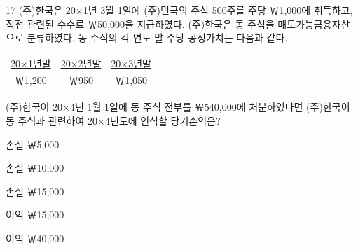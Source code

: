 \begin{question}{17}
(주)한국은 20×1년 3월 1일에 (주)민국의 주식 500주를 주당 ￦1,000에 취득하고, 직접 관련된 수수료 ￦50,000을 지급하였다. (주)한국은 동 주식을 매도가능금융자산으로 분류하였다. 동 주식의 각 연도 말 주당 공정가치는 다음과 같다.
{\centering\begin{tabular}{ccc}
\uline{20×1년말} & \uline{20×2년말} & \uline{20×3년말} \\
￦1,200 & ￦950 & ￦1,050 \\
\end{tabular}\par}
(주)한국이 20×4년 1월 1일에 동 주식 전부를 ￦540,000에 처분하였다면 (주)한국이 동 주식과 관련하여 20×4년도에 인식할 당기손익은? \par
\begin{choices}
  \item 손실 ￦5,000
  \item 손실 ￦10,000
  \item 손실 ￦15,000
  \item 이익 ￦15,000
  \item 이익 ￦40,000
\end{choices}
\end{question}
